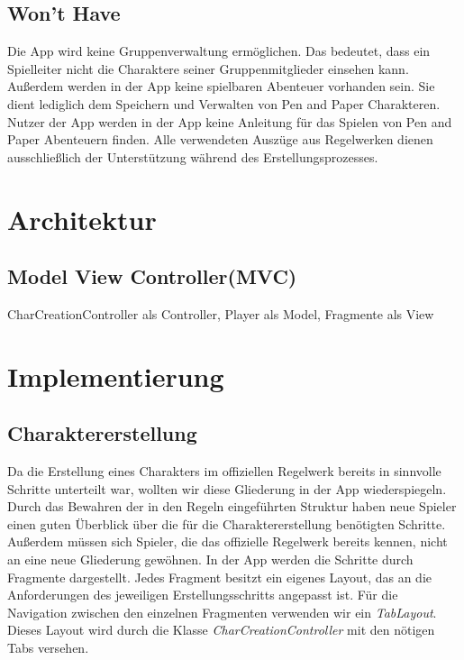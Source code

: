 \subsection{Won't Have}
Die App wird keine Gruppenverwaltung ermöglichen. Das bedeutet, dass ein Spielleiter nicht die Charaktere seiner Gruppenmitglieder einsehen kann. Außerdem werden in der App keine spielbaren Abenteuer vorhanden sein. Sie dient lediglich dem Speichern und Verwalten von Pen and Paper Charakteren. Nutzer der App werden in der App keine Anleitung für das Spielen von Pen and Paper Abenteuern finden. Alle verwendeten Auszüge aus Regelwerken dienen ausschließlich der Unterstützung während des Erstellungsprozesses. 

\newpage
\section{Architektur}
\subsection{Model View Controller(MVC)}
CharCreationController als Controller, Player als Model, Fragmente als View

\newpage
\section{Implementierung}

\subsection{Charaktererstellung}
Da die Erstellung eines Charakters im offiziellen Regelwerk bereits in sinnvolle Schritte unterteilt war, wollten wir diese Gliederung in der App wiederspiegeln. Durch das Bewahren der in den Regeln eingeführten Struktur haben neue Spieler einen guten Überblick über die für die Charaktererstellung benötigten Schritte. Außerdem müssen sich Spieler, die das offizielle Regelwerk bereits kennen, nicht an eine neue Gliederung gewöhnen. In der App werden die Schritte durch Fragmente dargestellt. Jedes Fragment besitzt ein eigenes Layout, das an die Anforderungen des jeweiligen Erstellungsschritts angepasst ist. Für die Navigation zwischen den einzelnen Fragmenten verwenden wir ein \textit{TabLayout}. Dieses Layout wird durch die Klasse \textit{CharCreationController} mit den nötigen Tabs versehen.\\

